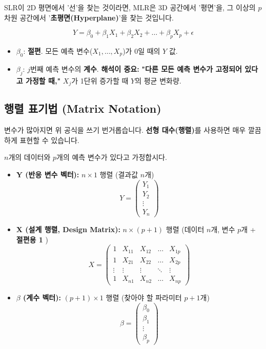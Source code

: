 \documentclass[11pt,a4paper]{book}
\theoremstyle{definition}
\begin{document}
SLR이 2D 평면에서 '선'을 찾는 것이라면, MLR은 3D 공간에서 '평면'을, 그 이상의 $p$차원 공간에서 '\textbf{초평면(Hyperplane)}'을 찾는 것입니다.

$$ Y = \beta_0 + \beta_1 X_1 + \beta_2 X_2 + \dots + \beta_p X_p + \epsilon $$

\begin{itemize}
    \item $\beta_0$: \textbf{절편}. 모든 예측 변수($X_1, \dots, X_p$)가 0일 때의 $Y$ 값.
    \item $\beta_j$: $j$번째 예측 변수의 \textbf{계수}.
    \textbf{해석이 중요:} \textbf{"다른 모든 예측 변수가 고정되어 있다고 가정할 때,"} $X_j$가 1단위 증가할 때 $Y$의 평균 변화량.
\end{itemize}

\subsection{행렬 표기법 (Matrix Notation)}

변수가 많아지면 위 공식을 쓰기 번거롭습니다. \textbf{선형 대수(행렬)}를 사용하면 매우 깔끔하게 표현할 수 있습니다.

$n$개의 데이터와 $p$개의 예측 변수가 있다고 가정합시다.

\begin{itemize}
    \item \textbf{Y (반응 변수 벡터):} $n \times 1$ 행렬 (결과값 $n$개)
    $$ Y = \begin{pmatrix} Y_1 \\ Y_2 \\ \vdots \\ Y_n \end{pmatrix} $$

    \item \textbf{X (설계 행렬, Design Matrix):} $n \times (p+1)$ 행렬 (데이터 $n$개, 변수 $p$개 + \textbf{절편용 1} )
    $$ X = \begin{pmatrix} 
    1 & X_{11} & X_{12} & \dots & X_{1p} \\
    1 & X_{21} & X_{22} & \dots & X_{2p} \\
    \vdots & \vdots & \vdots & \ddots & \vdots \\
    1 & X_{n1} & X_{n2} & \dots & X_{np}
    \end{pmatrix} $$
    
    \item \textbf{$\beta$ (계수 벡터):} $(p+1) \times 1$ 행렬 (찾아야 할 파라미터 $p+1$개)
    $$ \beta = \begin{pmatrix} \beta_0 \\ \beta_1 \\ \vdots \\ \beta_p \end{pmatrix} $$
\end{itemize}
\end{document}
